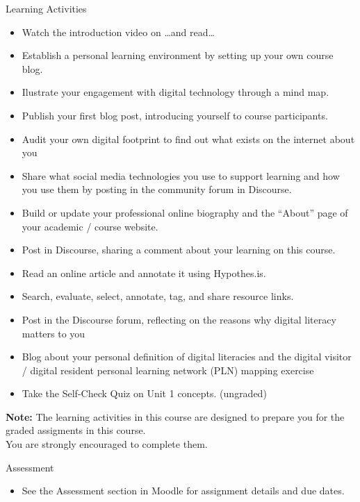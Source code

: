 \documentclass[
]{book}
\providecommand{\tightlist}{%
  \setlength{\itemsep}{0pt}\setlength{\parskip}{0pt}}
\theoremstyle{definition}
\theoremstyle{definition}
\theoremstyle{definition}
\theoremstyle{definition}
\theoremstyle{remark}
\begin{document}
\begin{reflect}
{Learning Activities}

\begin{itemize}
\tightlist
\item
  Watch the introduction video on \ldots and read\ldots{}
\item
  Establish a personal learning environment by setting up your own course blog.
\item
  Ilustrate your engagement with digital technology through a mind map.
\item
  Publish your first blog post, introducing yourself to course participants.\\
\item
  Audit your own digital footprint to find out what exists on the internet about you
\item
  Share what social media technologies you use to support learning and how you use them by posting in the community forum in Discourse.
\item
  Build or update your professional online biography and the ``About'' page of your academic / course website.\\
\item
  Post in Discourse, sharing a comment about your learning on this course.
\item
  Read an online article and annotate it using Hypothes.is.
\item
  Search, evaluate, select, annotate, tag, and share resource links.
\item
  Post in the Discourse forum, reflecting on the reasons why digital literacy matters to you
\item
  Blog about your personal definition of digital literacies and the digital visitor / digital resident personal learning network (PLN) mapping exercise
\item
  Take the Self-Check Quiz on Unit 1 concepts. (ungraded)
\end{itemize}

\textbf{Note:} The learning activities in this course are designed to prepare you for the graded assigments in this course.\\
You are strongly encouraged to complete them.
\end{reflect}

\begin{assessment}
{Assessment}

\begin{itemize}
\tightlist
\item
  See the Assessment section in Moodle for assignment details and due dates.
\end{itemize}
\end{assessment}
\end{document}
